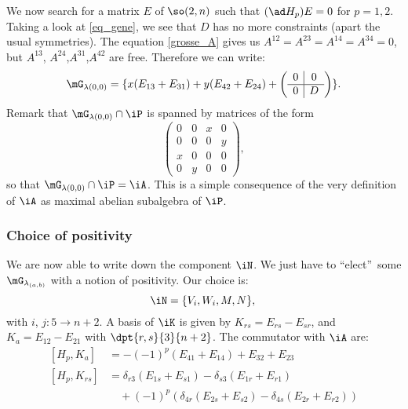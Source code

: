 We now search for a matrix $E$ of $\so(2,n)$ such that $(\ad H_p)E=0$ for $p=1,2$. Taking a look at \eqref{eq_gene}, we see that $D$ has no more constraints (apart the usual symmetries). The equation \eqref{grosse_A} gives us $A^{12}=A^{23}=A^{14}=A^{34}=0$, but $A^{13}$, $A^{24}$,$A^{31}$,$A^{42}$ are free. Therefore we can write:
\begin{equation}
  \mG_{\lambda(0,0)}=\{x(E_{13}+E_{31})+y(E_{42}+E_{24})+
    \left(\begin{array}{c|c}
    0&0\\
    \hline
    0&D
    \end{array}\right)
  \}.
\end{equation}
Remark that $\mG_{\lambda(0,0)}\cap\iP$ is spanned by matrices of the form
\[
\begin{pmatrix}
	0&0&x&0\\
	0&0&0&y\\
	x&0&0&0\\
	0&y&0&0
\end{pmatrix},
\]
so that $\mG_{\lambda(0,0)}\cap\iP=\iA$. This is a simple consequence of the very definition of $\iA$ as maximal abelian subalgebra of $\iP$.

\subsubsection{Choice of positivity}

We are now able to write down the component $\iN$. We just have to ``elect''\ some $\mG_{\lambda_{(a,b)}}$ with a notion of positivity. Our choice is:
 \begin{equation}
     \iN=\{V_i,W_i,M,N\},\\
 \end{equation}
with $i$, $j:5\to n+2$. A basis of $\iK$ is given by $K_{rs}=E_{rs}-E_{sr}$, and $K_a=E_{12}-E_{21}$ with $\dpt{r,s}{3}{n+2}$.  The commutator with $\iA$ are:
\begin{equation}
\begin{split}
[H_p,K_a]&=-(-1)^p(E_{41}+E_{14})+E_{32}+E_{23}\\
[H_p,K_{rs}]&=\delta_{r3}(E_{1s}+E_{s1})-\delta_{s3}(E_{1r}+E_{r1})\\
           &\quad+(-1)^p(\delta_{4r}(E_{2s}+E_{s2})-\delta_{4s}(E_{2r}+E_{r2}))
\end{split}
\end{equation}

